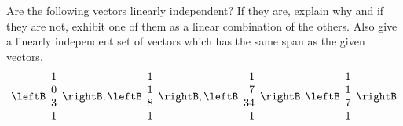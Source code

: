 \begin{enumialphparenastyle}
\begin{ex} Are the following vectors linearly independent? If they are, explain
why and if they are not, exhibit one of them as a linear combination of the
others. Also give a linearly independent set of vectors which has the same
span as the given vectors. 
\begin{equation*}
\leftB 
\begin{array}{r}
1 \\ 
0 \\ 
3 \\ 
1
\end{array}
\rightB ,\leftB 
\begin{array}{r}
1 \\ 
1 \\ 
8 \\ 
1
\end{array}
\rightB ,\leftB 
\begin{array}{r}
1 \\ 
7 \\ 
34 \\ 
1
\end{array}
\rightB ,\leftB 
\begin{array}{r}
1 \\ 
1 \\ 
7 \\ 
1
\end{array}
\rightB
\end{equation*}
\end{ex}


\end{enumialphparenastyle}
